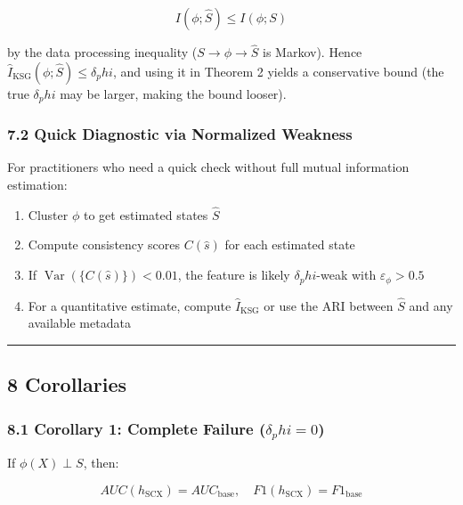 \documentclass[
  12pt,
]{ctexart}
\providecommand{\tightlist}{%
  \setlength{\itemsep}{0pt}\setlength{\parskip}{0pt}}
\begin{document}
\[I(\phi; \hat{S}) \leq I(\phi; S)\]

by the data processing inequality (\(S \to \phi \to \hat{S}\) is
Markov). Hence \(\hat{I}_{\text{KSG}}(\phi; \hat{S}) \leq \delta_phi\),
and using it in Theorem 2 yields a conservative bound (the true
\(\delta_phi\) may be larger, making the bound looser).

\subsubsection{7.2 Quick Diagnostic via Normalized
Weakness}\label{quick-diagnostic-via-normalized-weakness}

For practitioners who need a quick check without full mutual information
estimation:

\begin{enumerate}
\def\labelenumi{\arabic{enumi}.}
\tightlist
\item
  Cluster \(\phi\) to get estimated states \(\hat{S}\)
\item
  Compute consistency scores \(C(\hat{s})\) for each estimated state
\item
  If \(\operatorname{Var}(\{C(\hat{s})\}) < 0.01\), the feature is
  likely \(\delta_phi\)-weak with \(\varepsilon_\phi > 0.5\)
\item
  For a quantitative estimate, compute \(\hat{I}_{\text{KSG}}\) or use
  the ARI between \(\hat{S}\) and any available metadata
\end{enumerate}

\begin{center}\rule{0.5\linewidth}{0.5pt}\end{center}

\subsection{8 Corollaries}\label{corollaries}

\subsubsection{\texorpdfstring{8.1 Corollary 1: Complete Failure
(\(\delta_phi = 0\))}{8.1 Corollary 1: Complete Failure (\textbackslash delta\_phi = 0)}}\label{corollary-1-complete-failure-delta_phi-0}

If \(\phi(X) \perp S\), then:

\[AUC(h_{\text{SCX}}) = AUC_{\text{base}}, \quad F1(h_{\text{SCX}}) = F1_{\text{base}}\]
\end{document}
